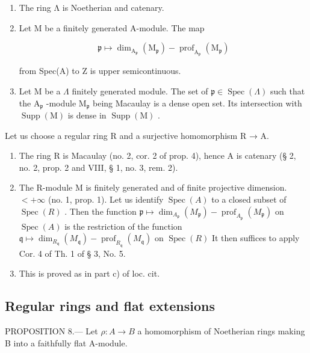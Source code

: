 \begin{enumerate}
\def\labelenumi{\alph{enumi})}
\item
  The ring Λ is Noetherian and catenary.
\item
  Let M be a finitely generated A-module. The map

\[
\mathfrak {p} \mapsto \dim_ {\mathrm{A} _ {\mathfrak {p}}} (\mathrm{M} _ {\mathfrak {p}}) - \operatorname{prof} _ {\mathrm{A} _ {\mathfrak {p}}} (\mathrm{M} _ {\mathfrak {p}})
\]

from Spec(A) to Z is upper semicontinuous.

\item
  Let M be a \(\Lambda\) finitely generated module. The set of \(\mathfrak{p} \in \operatorname{Spec}(\Lambda)\) such that the \(\mathrm{A}_{\mathfrak{p}}\) -module \(\mathrm{M}_{\mathfrak{p}}\) being Macaulay is a dense open set. Its intersection with \(\operatorname{Supp}(\mathrm{M})\) is dense in \(\operatorname{Supp}(\mathrm{M})\) .
\end{enumerate}

Let us choose a regular ring R and a surjective homomorphism R → A.

\begin{enumerate}
\def\labelenumi{\alph{enumi})}
\item
  The ring R is Macaulay (no. 2, cor. 2 of prop. 4), hence A is catenary (§ 2, no. 2, prop. 2 and VIII, § 1, no. 3, rem. 2).
\item
  The R-module M is finitely generated and of finite projective dimension. \(< +\infty\) (no. 1, prop. 1). Let us identify \(\operatorname{Spec}(A)\) to a closed subset of \(\operatorname{Spec}(R)\) . Then the function \(\mathfrak{p} \mapsto \dim_{A_{\mathfrak{p}}} (M_{\mathfrak{p}}) - \operatorname{prof}_{A_{\mathfrak{p}}} (M_{\mathfrak{p}})\) on \(\operatorname{Spec}(A)\) is the restriction of the function \(\mathfrak{q} \mapsto \dim_{R_{\mathfrak{q}}} (M_{\mathfrak{q}}) - \operatorname{prof}_{R_{\mathfrak{q}}} (M_{\mathfrak{q}})\) on \(\operatorname{Spec}(R)\) It then suffices to apply Cor. 4 of Th. 1 of § 3, No. 5.
\item
  This is proved as in part c) of loc. cit.
\end{enumerate}

\subsection{Regular rings and flat extensions}

PROPOSITION 8.--- Let \(\rho: A \to B\) a homomorphism of Noetherian rings making B into a faithfully flat A-module.

